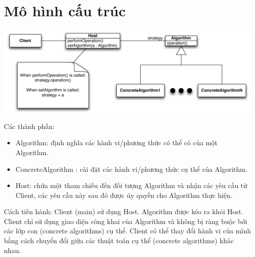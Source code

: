 \section{Mô hình cấu trúc}
\begin{center}
\includegraphics{GALLEYS/images/chapter9/diagram}
\end{center}
Các thành phần:
\begin{itemize}
\item Algorithm: định nghĩa các hành vi/phương thức có thể có của một Algorithm.
\item ConcreteAlgorithm : cài đặt các hành vi/phương thức cụ thể của Algorithm.
\item Host: chứa một tham chiếu đến đối tượng Algorithm và nhận các yêu cầu từ Client, các yêu cầu này sau đó được ủy quyền cho Algorithm thực hiện.
\end{itemize}
Cách tiến hành: Client (main) sử dụng Host. Algorithm được kéo ra khỏi Host. Client chỉ sử dụng giao diện công khai của Algorithm và không bị ràng buộc bởi các lớp con (concrete algorithms) cụ thể. Client có thể thay đổi hành vi của mình bằng cách chuyển đổi giữa các thuật toán cụ thể (concrete algorithms) khác nhau.
